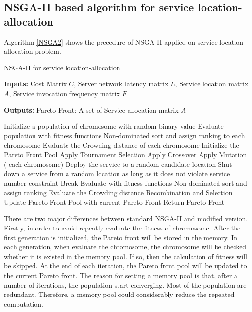 \documentclass{llncs}
\begin{document}



\subsection{NSGA-II based algorithm for service location-allocation}
Algorithm \ref{NSGA2} shows the precedure of NSGA-II applied on service location-allocation problem.
\begin{algorithm}[htb]
	\caption{NSGA-II for service location-allocation}
	\label{NSGA2}
	\textbf{Inputs:}
		Cost Matrix $C$,
		Server network latency matrix $L$, 
		Service location matrix $A$, 
		Service invocation frequency matrix $F$

	\textbf{Outputs:}
		Pareto Front: A set of Service allocation matrix $A$

	\begin{algorithmic}[1]
		\State Initialize a population of chromosome with random binary value
		\State Evaluate population with fitness functions
		\State Non-dominated sort and assign ranking to each chromosome
		\State Evaluate the Crowding distance of each chromosome
		\State Initialize the Pareto Front Pool
		\State Apply Tournament Selection
		\State Apply Crossover 
		\State Apply Mutation
		\For( each chromosome)
		\State Deploy the service to a random candidate location
		\EndWhile
		\State Shut down a service from a random location as long as it does not violate service number constraint
		\State Break
		\EndIf
		\EndWhile
		\State Evaluate with fitness functions
		\EndIf
		\State Non-dominated sort and assign ranking
		\State Evaluate the Crowding distance
		\EndFor
		\State Recombination and Selection
		\State Update Pareto Front Pool with current Pareto Front
		\EndWhile
		\State Return Pareto Front
	\end{algorithmic}
\end{algorithm}

There are two major differences between standard NSGA-II and modified version. Firstly, in order to avoid repeatly evaluate the fitness
of chromosome. After the first generation is initialized, the Pareto front will be 
stored in the memory. In each generation, when evaluate the chromosome, the chromosome will be checked whether it is existed in the memory pool. 
If so, then the calculation of fitness will be skipped. At the end of each iteration, the Pareto front pool will be updated to the current Pareto front.
The reason for setting a memory pool is that, after a number of iterations, the population start converging. 
Most of the population are redundant. Therefore, a memory pool could considerably reduce the repeated computation.
\end{document}
